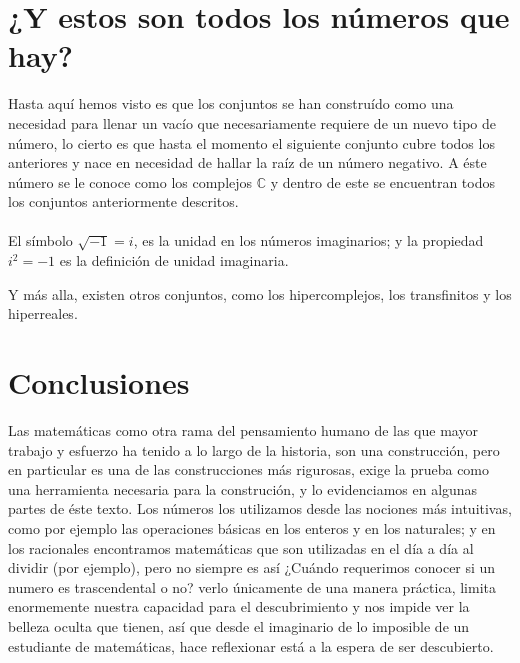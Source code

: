 \documentclass{article}
\begin{document}
\section{¿Y estos son todos los números que hay?}

Hasta aquí hemos visto es que los conjuntos se han construído como una necesidad para llenar un vacío que necesariamente requiere de un nuevo tipo de número, lo cierto es que hasta el momento el siguiente conjunto cubre todos los anteriores y nace en necesidad de hallar la raíz de un número negativo. A éste número se le conoce como los complejos $\mathbb{C}$ y dentro de este se encuentran todos los conjuntos anteriormente descritos.

\paragraph{} El símbolo $\sqrt{-1} = i$, es la unidad en los números imaginarios; y la propiedad $i^2 = -1$ es la definición de unidad imaginaria\cite{patino_duque_1977}.

Y más alla, existen otros conjuntos, como los hipercomplejos, los transfinitos y los hiperreales.

\section{Conclusiones}
Las matemáticas como otra rama del pensamiento humano de las que mayor trabajo y esfuerzo ha tenido a lo largo de la historia, son una construcción, pero en particular es una de las construcciones más rigurosas, exige la prueba como una herramienta necesaria para la construción, y lo evidenciamos en algunas partes de éste texto. Los números los utilizamos desde las nociones más intuitivas, como por ejemplo las operaciones básicas en los enteros y en los naturales; y en los racionales encontramos matemáticas que son utilizadas en el día a día al dividir (por ejemplo), pero no siempre es así ¿Cuándo requerimos conocer si un numero es trascendental o no? verlo únicamente de una manera práctica, limita enormemente nuestra capacidad para el descubrimiento y nos impide ver la belleza oculta que tienen, así que desde el imaginario de lo imposible de un estudiante de matemáticas, hace reflexionar está a la espera de ser descubierto.

\nocite{*}


\end{document}
